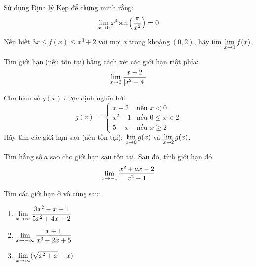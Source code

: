 \begin{exercise}
    Sử dụng Định lý Kẹp để chứng minh rằng:
    \begin{equation*}
        \lim\limits_{x \to 0} x^4 \sin\left(\dfrac{\pi}{x^2}\right) = 0
    \end{equation*}
\end{exercise}

\begin{exercise}
    Nếu biết $3x \le f(x) \le x^3 + 2$ với mọi $x$ trong khoảng $(0, 2)$, hãy tìm $\lim\limits_{x \to 1} f(x)$.
\end{exercise}

\begin{exercise}
    Tìm giới hạn (nếu tồn tại) bằng cách xét các giới hạn một phía:
    \begin{equation*}
         \lim\limits_{x \to 2} \dfrac{x-2}{\left\lvert x^2-4 \right\rvert}
    \end{equation*}
\end{exercise}

\begin{exercise}
    Cho hàm số $g(x)$ được định nghĩa bởi:
    \[ g(x) = \begin{cases} 
          x+2 & \text{nếu } x < 0 \\
          x^2-1 & \text{nếu } 0 \le x < 2 \\
          5-x & \text{nếu } x \ge 2 
       \end{cases}
    \]
    Hãy tìm các giới hạn sau (nếu tồn tại): $\lim\limits_{x \to 0} g(x)$ và $\lim\limits_{x \to 2} g(x)$.
\end{exercise}

\begin{exercise}
    Tìm hằng số $a$ sao cho giới hạn sau tồn tại. Sau đó, tính giới hạn đó.
    \begin{equation*}
        \lim\limits_{x \to -1} \dfrac{x^2 + ax - 2}{x^2 - 1}
    \end{equation*}
\end{exercise}
    
\begin{exercise}
    Tìm các giới hạn ở vô cùng sau:
    \begin{enumerate}[label=(\alph*)]
        \item $\lim\limits_{x \to \infty} \dfrac{3x^2 - x + 1}{5x^2 + 4x - 2}$
        \item $\lim\limits_{x \to -\infty} \dfrac{x+1}{x^3 - 2x + 5}$
        \item $\lim\limits_{x \to \infty} (\sqrt{x^2+x} - x)$
    \end{enumerate}
\end{exercise}


